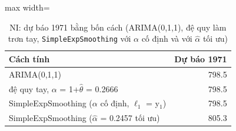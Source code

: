 \begin{table}[H]
\centering\footnotesize
\caption{NI: dự báo 1971 bằng bốn cách (ARIMA(0,1,1), đệ quy làm trơn tay, \texttt{SimpleExpSmoothing} với $\alpha$ cố định và với $\hat\alpha$ tối ưu)}\label{tab:tab_b12_07_ses_forecasts}
\begin{adjustbox}{max width=\linewidth}
\begin{tabular}{|>{\raggedright\arraybackslash}p{}|r|}
\toprule
Cách tính & Dự báo 1971 \\
\midrule
ARIMA(0,1,1) & 798.5 \\[3pt]
đệ quy tay, $\alpha$ = 1+$\hat{\theta}$ = 0.2666 & 798.5 \\[3pt]
SimpleExpSmoothing ($\alpha$ cố định, $\ell_{1}$ = y$_{1}$) & 798.5 \\[3pt]
SimpleExpSmoothing ($\hat{\alpha}$ = 0.2457 tối ưu) & 805.3 \\[3pt]
\bottomrule
\end{tabular}
\end{adjustbox}
\end{table}

